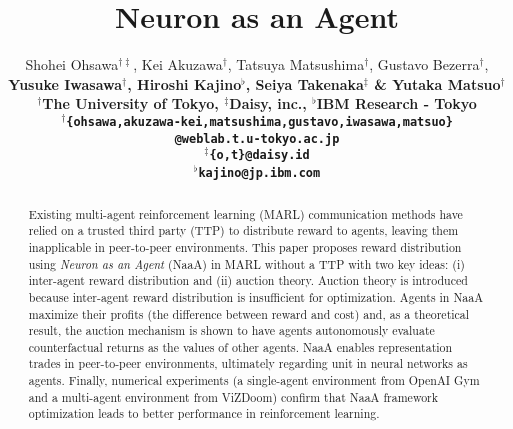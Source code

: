 \documentclass{article} %
\title{Neuron as an Agent}
\author{Shohei Ohsawa$^{\dagger\ddagger}$, Kei Akuzawa$^{\dagger}$, Tatsuya Matsushima$^{\dagger}$, Gustavo Bezerra$^{\dagger}$, \\
\bf Yusuke Iwasawa$^{\dagger}$, Hiroshi Kajino$^{\flat}$, Seiya Takenaka$^{\ddagger}$ \& Yutaka Matsuo$^{\dagger}$ \\
$^{\dagger}$The University of Tokyo, $^{\ddagger}$Daisy, inc., $^{\flat}$IBM Research - Tokyo \\
$^{\dagger}$\texttt{\{ohsawa,akuzawa-kei,matsushima,gustavo,iwasawa,matsuo\}}\\
\texttt{@weblab.t.u-tokyo.ac.jp} \\
$^{\ddagger}$\texttt{\{o,t\}@daisy.id} \\
$^{\flat}$\texttt{kajino@jp.ibm.com} \\
}
\begin{document}
\maketitle

\begin{abstract}
Existing multi-agent reinforcement learning (MARL) communication methods have relied on a trusted third party (TTP) to distribute reward to agents, leaving them inapplicable in peer-to-peer environments. This paper proposes reward distribution using {\em Neuron as an Agent} (NaaA) in MARL without a TTP with two key ideas: (i) inter-agent reward distribution and (ii) auction theory. Auction theory is introduced because inter-agent reward distribution is insufficient for optimization. Agents in NaaA maximize their profits (the difference between reward and cost) and, as a theoretical result, the auction mechanism is shown to have agents autonomously evaluate counterfactual returns as the values of other agents. NaaA enables representation trades in peer-to-peer environments, ultimately regarding unit in neural networks as agents. Finally, numerical experiments (a single-agent environment from OpenAI Gym and a multi-agent environment from ViZDoom) confirm that NaaA framework optimization leads to better performance in reinforcement learning.
\end{abstract}











\end{document}

